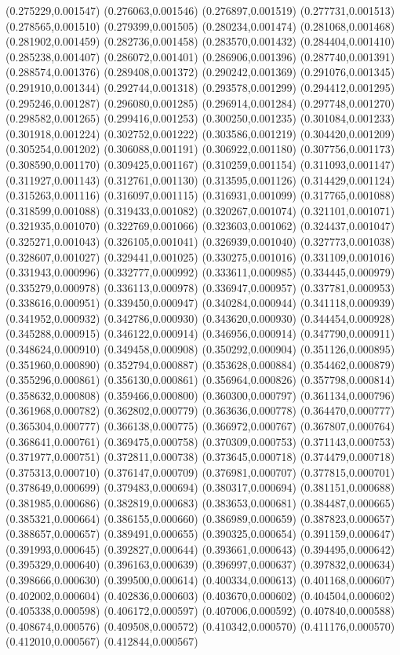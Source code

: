 {(0.275229,0.001547) (0.276063,0.001546) (0.276897,0.001519) (0.277731,0.001513) (0.278565,0.001510) (0.279399,0.001505) (0.280234,0.001474) (0.281068,0.001468) (0.281902,0.001459) (0.282736,0.001458) (0.283570,0.001432) (0.284404,0.001410) (0.285238,0.001407) (0.286072,0.001401) (0.286906,0.001396) (0.287740,0.001391) (0.288574,0.001376) (0.289408,0.001372) (0.290242,0.001369) (0.291076,0.001345) (0.291910,0.001344) (0.292744,0.001318) (0.293578,0.001299) (0.294412,0.001295) (0.295246,0.001287) (0.296080,0.001285) (0.296914,0.001284) (0.297748,0.001270) (0.298582,0.001265) (0.299416,0.001253) (0.300250,0.001235) (0.301084,0.001233) (0.301918,0.001224) (0.302752,0.001222) (0.303586,0.001219) (0.304420,0.001209) (0.305254,0.001202) (0.306088,0.001191) (0.306922,0.001180) (0.307756,0.001173) (0.308590,0.001170) (0.309425,0.001167) (0.310259,0.001154) (0.311093,0.001147) (0.311927,0.001143) (0.312761,0.001130) (0.313595,0.001126) (0.314429,0.001124) (0.315263,0.001116) (0.316097,0.001115) (0.316931,0.001099) (0.317765,0.001088) (0.318599,0.001088) (0.319433,0.001082) (0.320267,0.001074) (0.321101,0.001071) (0.321935,0.001070) (0.322769,0.001066) (0.323603,0.001062) (0.324437,0.001047) (0.325271,0.001043) (0.326105,0.001041) (0.326939,0.001040) (0.327773,0.001038) (0.328607,0.001027) (0.329441,0.001025) (0.330275,0.001016) (0.331109,0.001016) (0.331943,0.000996) (0.332777,0.000992) (0.333611,0.000985) (0.334445,0.000979) (0.335279,0.000978) (0.336113,0.000978) (0.336947,0.000957) (0.337781,0.000953) (0.338616,0.000951) (0.339450,0.000947) (0.340284,0.000944) (0.341118,0.000939) (0.341952,0.000932) (0.342786,0.000930) (0.343620,0.000930) (0.344454,0.000928) (0.345288,0.000915) (0.346122,0.000914) (0.346956,0.000914) (0.347790,0.000911) (0.348624,0.000910) (0.349458,0.000908) (0.350292,0.000904) (0.351126,0.000895) (0.351960,0.000890) (0.352794,0.000887) (0.353628,0.000884) (0.354462,0.000879) (0.355296,0.000861) (0.356130,0.000861) (0.356964,0.000826) (0.357798,0.000814) (0.358632,0.000808) (0.359466,0.000800) (0.360300,0.000797) (0.361134,0.000796) (0.361968,0.000782) (0.362802,0.000779) (0.363636,0.000778) (0.364470,0.000777) (0.365304,0.000777) (0.366138,0.000775) (0.366972,0.000767) (0.367807,0.000764) (0.368641,0.000761) (0.369475,0.000758) (0.370309,0.000753) (0.371143,0.000753) (0.371977,0.000751) (0.372811,0.000738) (0.373645,0.000718) (0.374479,0.000718) (0.375313,0.000710) (0.376147,0.000709) (0.376981,0.000707) (0.377815,0.000701) (0.378649,0.000699) (0.379483,0.000694) (0.380317,0.000694) (0.381151,0.000688) (0.381985,0.000686) (0.382819,0.000683) (0.383653,0.000681) (0.384487,0.000665) (0.385321,0.000664) (0.386155,0.000660) (0.386989,0.000659) (0.387823,0.000657) (0.388657,0.000657) (0.389491,0.000655) (0.390325,0.000654) (0.391159,0.000647) (0.391993,0.000645) (0.392827,0.000644) (0.393661,0.000643) (0.394495,0.000642) (0.395329,0.000640) (0.396163,0.000639) (0.396997,0.000637) (0.397832,0.000634) (0.398666,0.000630) (0.399500,0.000614) (0.400334,0.000613) (0.401168,0.000607) (0.402002,0.000604) (0.402836,0.000603) (0.403670,0.000602) (0.404504,0.000602) (0.405338,0.000598) (0.406172,0.000597) (0.407006,0.000592) (0.407840,0.000588) (0.408674,0.000576) (0.409508,0.000572) (0.410342,0.000570) (0.411176,0.000570) (0.412010,0.000567) (0.412844,0.000567) }
